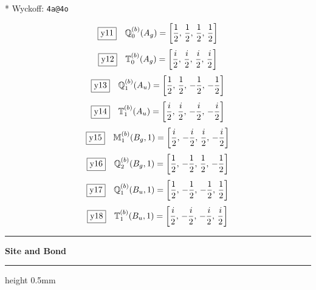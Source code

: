 \documentclass[fleqn,10pt,landscape]{jsarticle}
\begin{document}
\noindent ** Wyckoff: \texttt{4a@4o}

\begin{dmath*}
\fbox{y11}\quad \mathbb{Q}_{0}^{(b)}(A_{g})=\left[ \frac{1}{2},\, \frac{1}{2},\, \frac{1}{2},\, \frac{1}{2} \right]
\end{dmath*}
\begin{dmath*}
\fbox{y12}\quad \mathbb{T}_{0}^{(b)}(A_{g})=\left[ \frac{i}{2},\, \frac{i}{2},\, \frac{i}{2},\, \frac{i}{2} \right]
\end{dmath*}
\begin{dmath*}
\fbox{y13}\quad \mathbb{Q}_{1}^{(b)}(A_{u})=\left[ \frac{1}{2},\, \frac{1}{2},\, - \frac{1}{2},\, - \frac{1}{2} \right]
\end{dmath*}
\begin{dmath*}
\fbox{y14}\quad \mathbb{T}_{1}^{(b)}(A_{u})=\left[ \frac{i}{2},\, \frac{i}{2},\, - \frac{i}{2},\, - \frac{i}{2} \right]
\end{dmath*}
\begin{dmath*}
\fbox{y15}\quad \mathbb{M}_{1}^{(b)}(B_{g},1)=\left[ \frac{i}{2},\, - \frac{i}{2},\, \frac{i}{2},\, - \frac{i}{2} \right]
\end{dmath*}
\begin{dmath*}
\fbox{y16}\quad \mathbb{Q}_{2}^{(b)}(B_{g},1)=\left[ \frac{1}{2},\, - \frac{1}{2},\, \frac{1}{2},\, - \frac{1}{2} \right]
\end{dmath*}
\begin{dmath*}
\fbox{y17}\quad \mathbb{Q}_{1}^{(b)}(B_{u},1)=\left[ \frac{1}{2},\, - \frac{1}{2},\, - \frac{1}{2},\, \frac{1}{2} \right]
\end{dmath*}
\begin{dmath*}
\fbox{y18}\quad \mathbb{T}_{1}^{(b)}(B_{u},1)=\left[ \frac{i}{2},\, - \frac{i}{2},\, - \frac{i}{2},\, \frac{i}{2} \right]
\end{dmath*}
\vspace{5mm}
\noindent \rule[0.5mm]{5mm}{0.5mm}\hspace{3mm}\textbf{Site and Bond}\hspace{3mm}\leaders\hrule height 0.5mm\hfill\kern0pt
\vspace{3mm}
\end{document}
